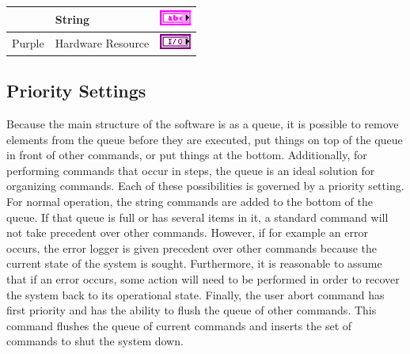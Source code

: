 \begin{table}[h]
\begin{tabular}{clc}
		& String								& \includegraphics[height=0.2in]{Figures/ColorCoding_String.eps}				\\\hline
Purple	& Hardware Resource					& \includegraphics[height=0.2in]{Figures/ColorCoding_HardwareReference.eps}	\\\hline
\end{tabular}\label{Tab:BPColorCoding}\end{table}











\subsection{Priority Settings}
Because the main structure of the software is as a queue, it is possible to remove elements from the queue before they are executed, put things on top of the queue in front of other commands, or put things at the bottom. Additionally, for performing commands that occur in steps, the queue is an ideal solution for organizing commands. Each of these possibilities is governed by a priority setting. For normal operation, the string commands are added to the bottom of the queue. If that queue is full or has several items in it, a standard command will not take precedent over other commands. However, if for example an error occurs, the error logger is given precedent over other commands because the current state of the system is sought. Furthermore, it is reasonable to assume that if an error occurs, some action will need to be performed in order to recover the system back to its operational state.  Finally, the user abort command has first priority and has the ability to flush the queue of other commands. This command flushes the queue of current commands and inserts the set of commands to shut the system down.


